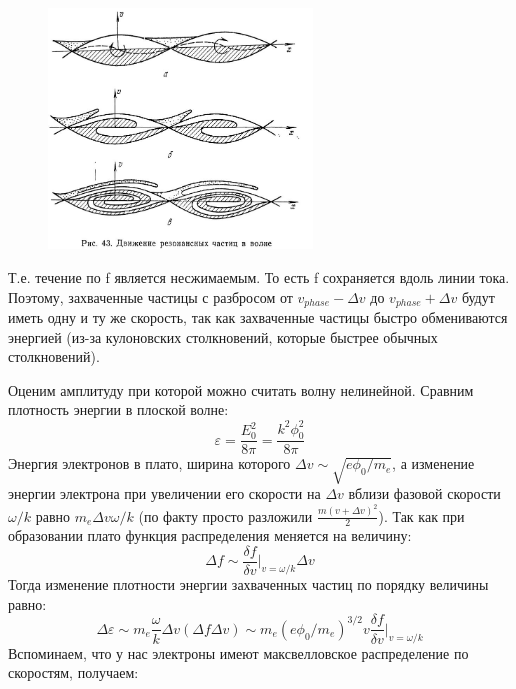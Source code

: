 \documentclass[10pt, a4paper]{article}
\begin{document}
\begin{figure}[ht]
	\begin{center}
		\includegraphics[width=70mm]{zatuh_landau_nonlinear_3.JPG}
	\end{center}
\end{figure}

Т.е. течение по f является несжимаемым. То есть f сохраняется вдоль линии тока. Поэтому, захваченные частицы с разбросом от $v_{phase} - \Delta v$ до  $v_{phase}+\Delta v$ будут иметь одну и ту же скорость, так как захваченные частицы быстро обмениваются энергией (из-за кулоновских столкновений, которые быстрее обычных столкновений).

Оценим амплитуду при которой можно считать волну нелинейной. Сравним плотность энергии в плоской волне:
\begin{equation}
	\varepsilon = \frac{E^{2}_0}{8 \pi} = \frac {k^2 \phi^{2}_0}{8 \pi}
\end{equation}
Энергия электронов в плато, ширина которого $\Delta v \sim \sqrt{e \phi_0 /m_e}$, а изменение энергии электрона при увеличении его скорости на $\Delta v$ вблизи фазовой скорости $\omega/k$ равно $m_e \Delta v \omega /k$ (по факту просто разложили $\frac{m(v+\Delta v)^2}{2}$).
Так как при образовании плато функция распределения меняется на величину:
\begin{equation}
	\Delta f \sim \frac{\delta f}{\delta v}|_{v=\omega/k} \Delta v
\end{equation}
Тогда изменение плотности энергии захваченных частиц по порядку величины равно:
\begin{equation}
	\Delta \varepsilon \sim m_e \frac{\omega}{k} \Delta v (\Delta f \Delta v ) \sim m_e (e \phi_0 /m_e)^{3/2} v \frac{\delta f}{\delta v}|_{v=\omega/k} 
\end{equation}
Вспоминаем, что у нас электроны имеют максвелловское распределение по скоростям, получаем:
\end{document}
